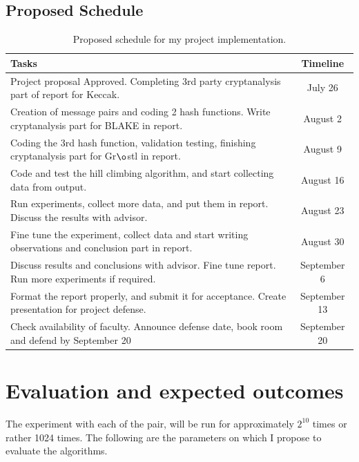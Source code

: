 \documentclass[12pt]{artikel3}                  %
\begin{document}
\subsection{Proposed Schedule}
\begin{table}[h]
  \begin{center}
    \begin{tabular}{ | p{12cm} | c | } \hline
      Tasks                                                                                                   & Timeline \\ \hline
      Project proposal Approved. Completing 3rd party cryptanalysis part of report for Keccak.                & July 26 \\ \hline
      Creation of message pairs and coding 2 hash functions. Write cryptanalysis part for BLAKE in report.    & August 2 \\ \hline
      Coding the 3rd hash function, validation testing, finishing cryptanalysis part for Gr$\o$stl in report. & August 9 \\ \hline
      Code and test the hill climbing algorithm, and start collecting data from output.                       & August 16 \\ \hline
      Run experiments, collect more data, and put them in report. Discuss the results with advisor.           & August 23 \\ \hline
      Fine tune the experiment, collect data and start writing observations and conclusion part in report.    & August 30 \\ \hline
      Discuss results and conclusions with advisor. Fine tune report. Run more experiments if required.       & September 6 \\ \hline
      Format the report properly, and submit it for acceptance. Create presentation for project defense.      & September 13 \\ \hline
      Check availability of faculty. Announce defense date, book room and defend by September 20              & September 20 \\ \hline
    \end{tabular}
  \caption{Proposed schedule for my project implementation.}
  \end{center}
\end{table}

\section{Evaluation and expected outcomes}
The experiment with each of the pair, will be run for approximately $2^{10}$ times or rather 1024 times.
The following are the parameters on which I propose to evaluate the algorithms. 
\end{document}
